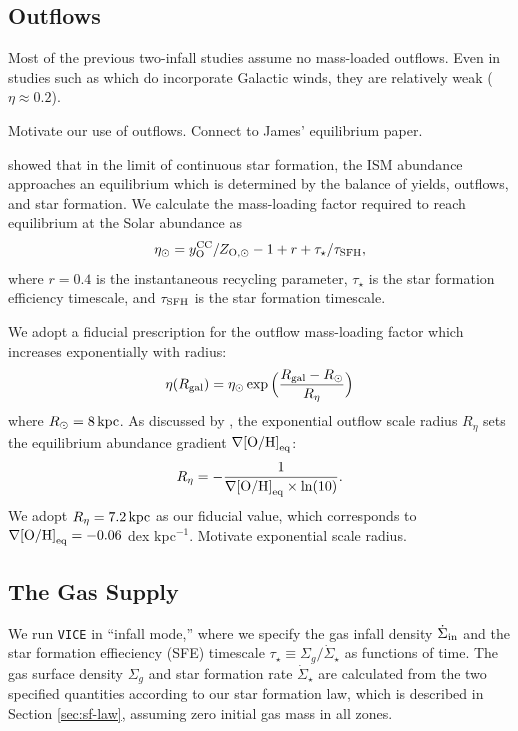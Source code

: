 \documentclass[twocolumn,twocolappendix,linenumbers]{aastex631}
\newcommand{\todo}[1]{{\color{red}#1}}
\begin{document}
\subsection{Outflows}
\label{sec:outflows}

Most of the previous two-infall studies assume no mass-loaded outflows. Even in studies such as \citet{palicio_analytic_2023} which do incorporate Galactic winds, they are relatively weak ($\eta\approx0.2$). 

\todo{Motivate our use of outflows. Connect to James' equilibrium paper.}

\citet{weinberg_equilibrium_2017} showed that in the limit of continuous star formation, the ISM abundance approaches an equilibrium which is determined by the balance of yields, outflows, and star formation. We calculate the mass-loading factor required to reach equilibrium at the Solar abundance as
\begin{equation}
    \eta_\odot = y_{\rm O}^{\rm CC} / Z_{\rm O,\odot} - 1 + r + \tau_\star / \tau_{\rm SFH},
\end{equation}
where $r=0.4$ is the instantaneous recycling parameter, $\tau_\star$ is the star formation efficiency timescale, and $\tau_{\rm SFH}$ is the star formation timescale.

We adopt a fiducial prescription for the outflow mass-loading factor which increases exponentially with radius:
\begin{equation}
    \eta(R_{\rm gal}) = \eta_\odot \exp\Big(\frac{R_{\rm gal}-R_\odot}{R_\eta}\Big)
\end{equation}
where $R_\odot=8\,{\rm kpc}$. As discussed by \citet{johnson_milky_2024}, the exponential outflow scale radius $R_\eta$ sets the equilibrium abundance gradient $\nabla{\rm [O/H]}_{\rm eq}$:
\begin{equation}
    R_\eta = -\frac{1}{\nabla{\rm [O/H]}_{\rm eq} \times\ln(10)}.
\end{equation}
We adopt $R_\eta=7.2\,{\rm kpc}$ as our fiducial value, which corresponds to $\nabla{\rm [O/H]}_{\rm eq}=-0.06$ dex kpc$^{-1}$.
\todo{Motivate exponential scale radius.}

\subsection{The Gas Supply}
\label{sec:sfh}

We run {\tt VICE} in ``infall mode,'' where we specify the gas infall density $\dot\Sigma_{\rm in}$ and the star formation effieciency (SFE) timescale $\tau_\star\equiv \Sigma_g / \dot\Sigma_\star$ as functions of time. The gas surface density $\Sigma_g$ and star formation rate $\dot\Sigma_\star$ are calculated from the two specified quantities according to our star formation law, which is described in Section \ref{sec:sf-law}, assuming zero initial gas mass in all zones.
\end{document}
